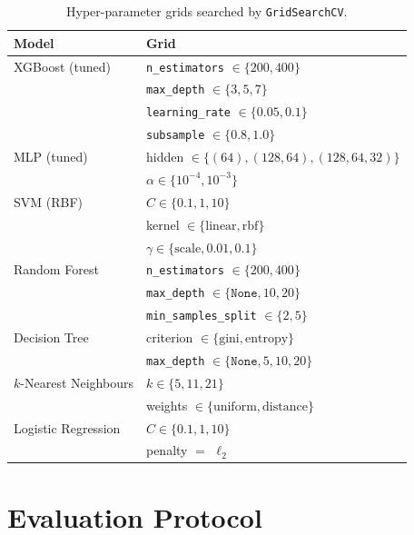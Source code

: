 \documentclass[conference]{IEEEtran}
\begin{document}
\begin{table}[!t]
\centering
\caption{Hyper-parameter grids searched by \texttt{GridSearchCV}.}
\label{tab:grids}
\begin{tabular}{ll}
\toprule
\textbf{Model} & \textbf{Grid} \\
\midrule
XGBoost (tuned)
  & \texttt{n\_estimators} $\in \{200, 400\}$ \\
  & \texttt{max\_depth} $\in \{3, 5, 7\}$ \\
  & \texttt{learning\_rate} $\in \{0.05, 0.1\}$ \\
  & \texttt{subsample} $\in \{0.8, 1.0\}$ \\
\midrule
MLP (tuned)
  & hidden $\in \{(64),(128,64),(128,64,32)\}$ \\
  & $\alpha \in \{10^{-4}, 10^{-3}\}$ \\
\midrule
SVM (RBF)
  & $C \in \{0.1, 1, 10\}$ \\
  & kernel $\in \{\text{linear}, \text{rbf}\}$ \\
  & $\gamma \in \{\text{scale}, 0.01, 0.1\}$ \\
\midrule
Random Forest
  & \texttt{n\_estimators} $\in \{200, 400\}$ \\
  & \texttt{max\_depth} $\in \{\texttt{None}, 10, 20\}$ \\
  & \texttt{min\_samples\_split} $\in \{2, 5\}$ \\
\midrule
Decision Tree
  & criterion $\in \{\text{gini}, \text{entropy}\}$ \\
  & \texttt{max\_depth} $\in \{\texttt{None}, 5, 10, 20\}$ \\
\midrule
$k$-Nearest Neighbours
  & $k \in \{5, 11, 21\}$ \\
  & weights $\in \{\text{uniform}, \text{distance}\}$ \\
\midrule
Logistic Regression
  & $C \in \{0.1, 1, 10\}$ \\
  & penalty $=$ $\ell_2$ \\
\bottomrule
\end{tabular}
\end{table}

\section{Evaluation Protocol}\label{sec:eval}
\end{document}
